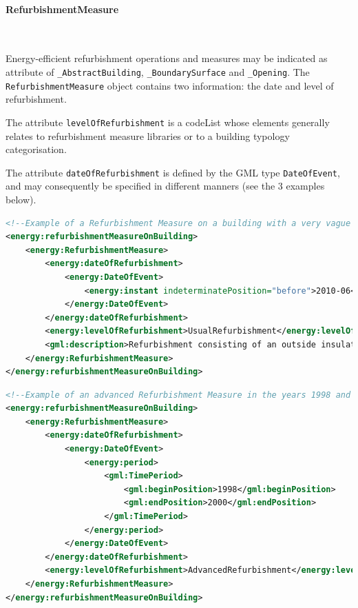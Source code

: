 \documentclass[a4paper,12pt]{article}
\let\stdparagraph\paragraph%
\renewcommand{\paragraph}[1]{\stdparagraph{#1}\mbox{}\\\vspace{-0.5cm}}
\begin{document}
\paragraph{RefurbishmentMeasure}\label{refurbishmentmeasure}

Energy-efficient refurbishment operations and measures may be indicated
as attribute of \lstinline!_AbstractBuilding!,
\lstinline!_BoundarySurface! and \lstinline!_Opening!. The
\lstinline!RefurbishmentMeasure! object contains two information: the
date and level of refurbishment.

The attribute \lstinline!levelOfRefurbishment! is a codeList whose
elements generally relates to refurbishment measure libraries or to a
building typology categorisation.

The attribute \lstinline!dateOfRefurbishment! is defined by the GML type
\lstinline!DateOfEvent!, and may consequently be specified in different
manners (see the 3 examples below).

\begin{lstlisting}[language=XML]
<!--Example of a Refurbishment Measure on a building with a very vague date ("before June 2010") -->
<energy:refurbishmentMeasureOnBuilding>
    <energy:RefurbishmentMeasure>
        <energy:dateOfRefurbishment>
            <energy:DateOfEvent>
                <energy:instant indeterminatePosition="before">2010-06</energy:instant>
            </energy:DateOfEvent>
        </energy:dateOfRefurbishment>
        <energy:levelOfRefurbishment>UsualRefurbishment</energy:levelOfRefurbishment>
        <gml:description>Refurbishment consisting of an outside insulation of walls etc.</gml:description>
    </energy:RefurbishmentMeasure>
</energy:refurbishmentMeasureOnBuilding>
\end{lstlisting}

\begin{lstlisting}[language=XML]
<!--Example of an advanced Refurbishment Measure in the years 1998 and 1999 -->
<energy:refurbishmentMeasureOnBuilding>
    <energy:RefurbishmentMeasure>
        <energy:dateOfRefurbishment>
            <energy:DateOfEvent>
                <energy:period>
                    <gml:TimePeriod>
                        <gml:beginPosition>1998</gml:beginPosition>
                        <gml:endPosition>2000</gml:endPosition>
                    </gml:TimePeriod>
                </energy:period>
            </energy:DateOfEvent>
        </energy:dateOfRefurbishment>
        <energy:levelOfRefurbishment>AdvancedRefurbishment</energy:levelOfRefurbishment>
    </energy:RefurbishmentMeasure>
</energy:refurbishmentMeasureOnBuilding>
\end{lstlisting}
\end{document}
